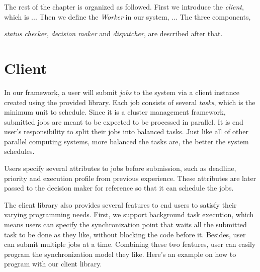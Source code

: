 The rest of the chapter is organized as followed.  
First we introduce the \emph{client}, which is ...
Then we define the \emph{Worker} in our system, ...
The three components, { \emph{status checker}, \emph{decision maker} and \emph{dispatcher}, are described after that.


\section{Client}

In our framework, a user will submit \emph{jobs} to the system via a
client instance created using the provided library.
Each job consists of several \emph{tasks}, which is the minimum unit to
schedule.
Since it is a cluster management framework, submitted jobs are meant to
be expected to be processed in parallel. It is end user's responsibility
to split their jobs into balanced tasks.
Just like all of other parallel computing systems, more balanced the
tasks are, the better the system schedules.

Users specify several attributes to jobs before submission, such as
deadline, priority and execution profile from previous experience.
These attributes are later passed to the decision maker for reference so
that it can schedule the jobs.

The client library also provides several features to end users to
satisfy their varying programming needs.
First, we support background task execution, which means users can
specify the synchronization point that waits all the submitted task to
be done as they like, without blocking the code before it.
Besides, user can submit multiple jobs at a time.
Combining these two features, user can easily program the
synchronization model they like.
Here's an example on how to program with our client library.

\begin{Example Code}


\end{Example Code}}
